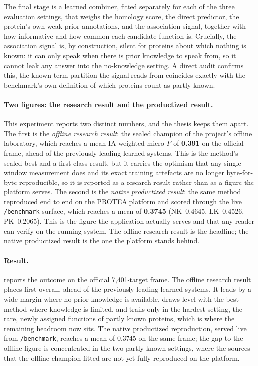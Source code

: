 The final stage is a learned combiner, fitted separately for each of the three
evaluation settings, that weighs the homology score, the direct predictor, the
protein's own weak prior annotations, and the association signal, together with
how informative and how common each candidate function is. Crucially, the
association signal is, by construction, silent for proteins about which nothing is
known: it can only speak when there is prior knowledge to speak from, so it cannot
leak any answer into the no-knowledge setting. A direct audit confirms this, the
known-term partition the signal reads from coincides exactly with the benchmark's
own definition of which proteins count as partly known.

\paragraph{Two figures: the research result and the productized result.}
This experiment reports two distinct numbers, and the thesis keeps them apart.
The first is the \emph{offline research result}: the sealed champion of the
project's offline laboratory, which reaches a mean IA-weighted micro-$F$ of
\textbf{0.391} on the official frame, ahead of the previously leading learned
systems. This is the method's sealed best and a first-class result, but it
carries the optimism that any single-window measurement does and its exact
training artefacts are no longer byte-for-byte reproducible, so it is reported
as a research result rather than as a figure the platform serves. The second is
the \emph{native productized result}: the same method reproduced end to end on
the PROTEA platform and scored through the live \texttt{/benchmark} surface,
which reaches a mean of \textbf{0.3745} (NK~0.4645, LK~0.4526, PK~0.2065). This
is the figure the application actually serves and that any reader can verify on
the running system. The offline research result is the headline; the native
productized result is the one the platform stands behind.

\paragraph{Result.}
 reports the outcome on the official 7{,}401-target frame.
The offline research result places first overall, ahead of the previously
leading learned systems. It leads by a wide margin where no prior knowledge is
available, draws level with the best method where knowledge is limited, and
trails only in the hardest setting, the rare, newly assigned functions of partly
known proteins, which is where the remaining headroom now sits. The native
productized reproduction, served live from \texttt{/benchmark}, reaches a mean of
0.3745 on the same frame; the gap to the offline figure is concentrated in the
two partly-known settings, where the sources that the offline champion fitted are
not yet fully reproduced on the platform.

